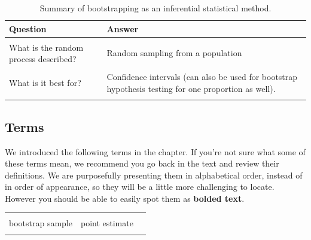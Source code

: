 \documentclass[
  10pt,
  openany]{book}
\begin{document}
\begin{table}[!h]

\caption{\label{tab:chp12-summary}Summary of bootstrapping as an inferential statistical method.}
\centering
\begin{tabu} to 
\toprule
Question & Answer\\
\midrule
{} & \\
\addlinespace
What is the random process described? & Random sampling from a population\\
\addlinespace
{} & \\
\addlinespace
What is it best for? & Confidence intervals (can also be used for bootstrap hypothesis testing for one proportion as well).\\
\addlinespace
{} & \\
\bottomrule
\end{tabu}
\end{table}

\hypertarget{terms-6}{%
\subsection{Terms}\label{terms-6}}

We introduced the following terms in the chapter.
If you're not sure what some of these terms mean, we recommend you go back in the text and review their definitions.
We are purposefully presenting them in alphabetical order, instead of in order of appearance, so they will be a little more challenging to locate.
However you should be able to easily spot them as \textbf{bolded text}.

\begin{tabu} to 
\toprule
{} &  & \\
bootstrap sample & point estimate & \\
 &  & \\
\bottomrule
\end{tabu}
\end{document}
